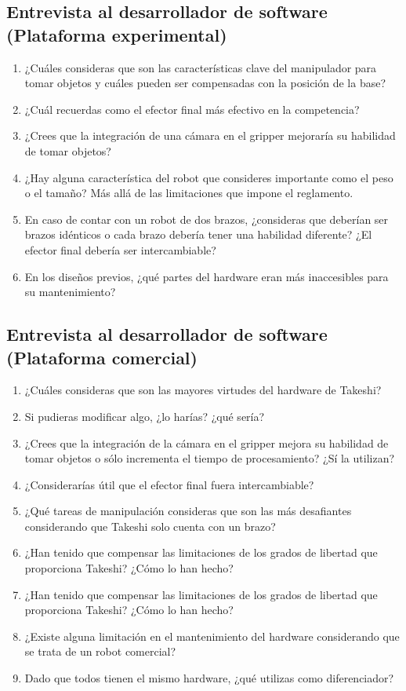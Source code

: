 \subsection*{Entrevista al desarrollador de software (Plataforma experimental)}

\begin{enumerate}
    \item ¿Cuáles consideras que son las características clave del manipulador para tomar objetos y cuáles pueden ser compensadas con la posición de la base?
    \item ¿Cuál recuerdas como el efector final más efectivo en la competencia?
    \item ¿Crees que la integración de una cámara en el gripper mejoraría su habilidad de tomar objetos?
    \item ¿Hay alguna característica del robot que consideres importante como el peso o el tamaño? Más allá de las limitaciones que impone el reglamento.
    \item En caso de contar con un robot de dos brazos, ¿consideras que deberían ser brazos idénticos o cada brazo debería tener una habilidad diferente? ¿El efector final debería ser intercambiable?
    \item En los diseños previos, ¿qué partes del hardware eran más inaccesibles para su mantenimiento?
\end{enumerate}

\subsection*{Entrevista al desarrollador de software (Plataforma comercial)}

\begin{enumerate}
    \item ¿Cuáles consideras que son las mayores virtudes del hardware de Takeshi?
    \item Si pudieras modificar algo, ¿lo harías? ¿qué sería?
    \item ¿Crees que la integración de la cámara en el gripper mejora su habilidad de tomar objetos o sólo incrementa el tiempo de procesamiento? ¿Sí la utilizan?
    \item ¿Considerarías útil que el efector final fuera intercambiable?
    \item ¿Qué tareas de manipulación consideras que son las más desafiantes considerando que Takeshi solo cuenta con un brazo?
    \item ¿Han tenido que compensar las limitaciones de los grados de libertad que proporciona Takeshi? ¿Cómo lo han hecho?
    \item ¿Han tenido que compensar las limitaciones de los grados de libertad que proporciona Takeshi? ¿Cómo lo han hecho?
    \item ¿Existe alguna limitación en el mantenimiento del hardware considerando que se trata de un robot comercial?
    \item Dado que todos tienen el mismo hardware, ¿qué utilizas como diferenciador?
\end{enumerate}


